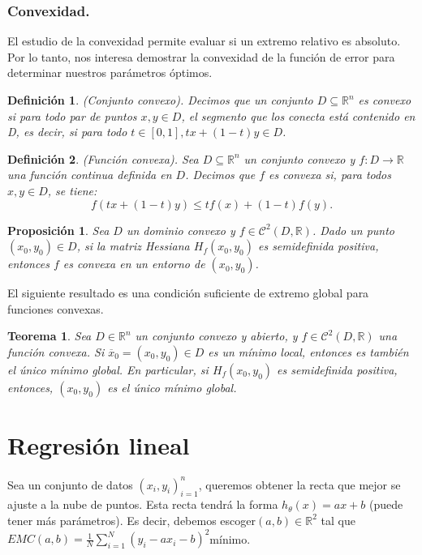\documentclass[a4paper,11pt]{article}
\newtheorem{theorem}{Teorema}
\newtheorem{proposition}{Proposición}
\newtheorem{definition}{Definición}
\begin{document}
\subsubsection{Convexidad.}

El estudio de la convexidad permite evaluar si un extremo relativo es absoluto. Por lo tanto, nos interesa demostrar la convexidad de la función de error para determinar nuestros parámetros óptimos.\\

\noindent
\begin{definition}(Conjunto convexo). Decimos que un conjunto $D\subseteq \mathbb{R}^n$
es convexo si para todo par de puntos $x,y \in D$, el segmento que los conecta está contenido en D, es decir, si para todo $t\in[0,1],tx+(1-t)y\in D$.
\end{definition}
\begin{definition} (Función convexa). Sea $D\subseteq \mathbb{R}^n$ un conjunto convexo y $f: D\rightarrow \mathbb{R}$ una función continua definida en $D$. Decimos que $f$ es convexa si, para todos $x,y\in D$, se tiene:
\[
f(tx+(1-t)y) \leq tf(x)+(1-t)f(y).
\]
\end{definition}

\begin{proposition}
Sea $D$ un dominio convexo y $f\in\mathcal{C}^2(D,\mathbb{R})$. Dado un punto
$(x_0, y_0) \in D$, si la matriz Hessiana $H_f (x_0, y_0)$ es semidefinida positiva, entonces
$f$ es convexa en un entorno de $(x_0, y_0)$.
\end{proposition}
\noindent
El siguiente resultado es una condición suficiente de extremo global para funciones convexas.
\begin{theorem}
Sea $D\in\mathbb{R}^n$ un conjunto convexo y abierto, y $f\in\mathcal{C}^2(D,\mathbb{R})$ una función convexa. Si $\overline{x}_0=(x_0,y_0)\in D$ es un mínimo local, entonces es también el único mínimo global. En particular, si $H_f(x_0,y_0)$ es semidefinida positiva, entonces, $(x_0,y_0)$ es el único mínimo global.
\end{theorem}
\newpage
\section{Regresión lineal}

Sea un conjunto de datos $(x_i,y_i)^n_{i=1}$, queremos obtener la recta que mejor se ajuste a la nube de puntos. Esta recta tendrá la forma $h_\theta(x)= ax+b$ (puede tener  más parámetros). Es decir, debemos escoger$  (a,b)\in \mathbb{R}^2 $ tal que $EMC(a,b) = \frac{1}{N} \sum_{i=1}^{N}(y_{i}-ax_{i}-b)^2 $mínimo. \\
\end{document}
